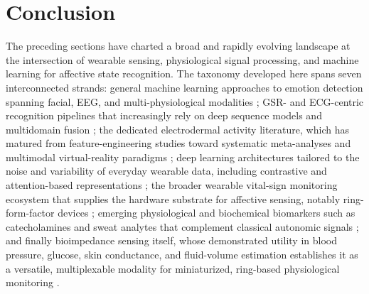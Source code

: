 \section{Conclusion}\label{sec:conclusion}
The preceding sections have charted a broad and rapidly evolving landscape at the intersection of wearable sensing, physiological signal processing, and machine learning for affective state recognition. The taxonomy developed here spans seven interconnected strands: general machine learning approaches to emotion detection spanning facial, EEG, and multi-physiological modalities \cite{sharma2023emotion,houssein2022human,khare2023emotion,liu2018human,song2019mped}; GSR- and ECG-centric recognition pipelines that increasingly rely on deep sequence models and multidomain fusion \cite{lisetti2004noninvasive,sumanth2025bilstm,site2026emotion,hui2018coverage,dessai2024multimodal}; the dedicated electrodermal activity literature, which has matured from feature-engineering studies toward systematic meta-analyses and multimodal virtual-reality paradigms \cite{damelio2025emotion,diaz2024fractal,polo2025advancing,damelio2023exploring,cimtay2020cross}; deep learning architectures tailored to the noise and variability of everyday wearable data, including contrastive and attention-based representations \cite{saganowski2022emotion,dissanayake2022sigrep,filippini2022automated,li2024comparison,zou2024emotion}; the broader wearable vital-sign monitoring ecosystem that supplies the hardware substrate for affective sensing, notably ring-form-factor devices \cite{lindstrom2025wearable,wang2025computing,sabry2022machine,dias2018wearable,mayoral2021fiber}; emerging physiological and biochemical biomarkers such as catecholamines and sweat analytes that complement classical autonomic signals \cite{gutierrezmartin2022fear,shahid2026comparative,qu2024advancing,qu2024student,zamkah2020identification}; and finally bioimpedance sensing itself, whose demonstrated utility in blood pressure, glucose, skin conductance, and fluid-volume estimation establishes it as a versatile, multiplexable modality for miniaturized, ring-based physiological monitoring \cite{sel2023continuous,sanai2021evaluation,miranda2023self,noori2025sensitivity,jacobs2026advancing}.

